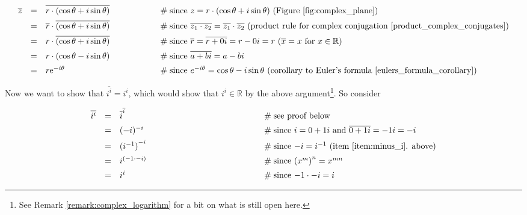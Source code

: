 \documentclass{article}
\theoremstyle{definition}
\begin{document}
\begin{equation*}
\begin{array}{llll}
\overline{z}
&=& \overline{r \cdot (\cos \theta + i \sin \theta)} 
		&\hspace{5em} \mathrel{\#} \text{since $z = r \cdot (\cos\theta+i\sin\theta)$ 
		(Figure \ref{fig:complex_plane})}\\
[5pt]
&=& \overline{r} \cdot \overline{(\cos \theta + i \sin \theta)} 
		&\hspace{5em} \mathrel{\#} \text{since $\overline{z_1 \cdot z_2} = \overline{z_1}\cdot \overline{z_2}$ 
		(product rule for complex conjugation \cite{product_complex_conjugates})} \\
[5pt]
&=& r \cdot \overline{(\cos \theta + i \sin \theta)} 
		&\hspace{5em} \mathrel{\#} \text{since $\overline{r} = \overline{r + 0i} = r - 0i = r$ 
		($\overline{x} = x$ for $x \in \mathbb{R}$)} \\
[5pt]
&=& r \cdot (\cos \theta - i \sin \theta)
		&\hspace{5em} \mathrel{\#} \text{since $\overline{a+bi} = a-bi$} \\
[5pt]
&=& r \mathrm{e}^{-i\theta}
		&\hspace{5em} \mathrel{\#} \text{since $e^{-i\theta} = \cos \theta - i \sin \theta$
		(corollary to Euler's formula \cite{eulers_formula_corollary})}
\end{array}
\end{equation*}

\noindent
Now we want to show that $\overline{i^i} = i^i$, which would
show that $i^i \in \mathbb{R}$ by the above argument\footnote{See 
Remark \ref{remark:complex_logarithm} for a bit on what is still
open here.}. So consider

\begin{equation*}
\begin{array}{llll}
\overline{i^i}
&=& {\overline{i}}^{\overline{i}}       &\hspace{13em} \mathrel{\#} \text{see proof below} \\
[5pt]
&=& (-i)^{-i}                           &\hspace{13em} \mathrel{\#} \text{since $i = 0+1i$ and $\overline{0+1i} = -1i = -i$} \\
[5pt]
&=& {(i^{-1})}^{-i}                     &\hspace{13em} \mathrel{\#} \text{since $-i = i^{-1}$ (item \ref{item:minus_i}. above)} \\
[5pt]
&=& i^{(-1 \cdot -i)}                   &\hspace{13em} \mathrel{\#} \text{since ${(x^m)}^{n} = x^{mn}$} \\
[5pt]
&=& i^i                                 &\hspace{13em} \mathrel{\#} \text{since $-1 \cdot -i = i$}
\end{array}
\end{equation*}
\end{document}
